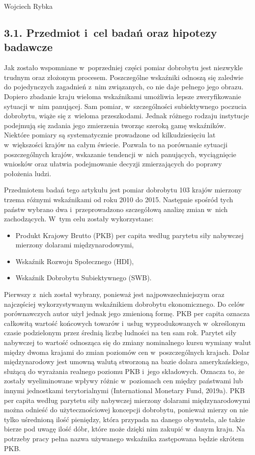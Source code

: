 \begin{artplenv}{Wojciech Rybka}
\subsection{3.1. Przedmiot i~cel badań oraz hipotezy badawcze}
Jak zostało wspomniane w~poprzedniej części pomiar dobrobytu jest niezwykle trudnym oraz złożonym procesem. Poszczególne
wskaźniki odnoszą się zaledwie do pojedynczych zagadnień z~nim związanych, co nie daje pełnego jego obrazu. Dopiero
zbadanie kraju wieloma wskaźnikami umożliwia lepsze zweryfikowanie sytuacji w~nim panującej.
Sam pomiar, w~szczególności subiektywnego poczucia dobrobytu, wiąże się z~wieloma przeszkodami.
Jednak różnego rodzaju instytucje
podejmują się zadania jego zmierzenia tworząc szeroką gamę wskaźników. Niektóre pomiary są systematycznie prowadzone od
kilkudziesięciu lat w~większości krajów na całym świecie. Pozwala to na porównanie sytuacji poszczególnych krajów,
wskazanie tendencji w~nich panujących, wyciągnięcie wniosków oraz ułatwia podejmowanie decyzji zmierzających do poprawy
położenia ludzi. 

Przedmiotem badań tego artykułu jest pomiar dobrobytu 103 krajów mierzony trzema różnymi wskaźnikami od roku 2010 do
2015. Następnie spośród tych państw wybrano dwa i~przeprowadzono szczegółową analizę zmian w~nich zachodzących.
W~tym celu zostały wykorzystane: 

\begin{itemize}
\item Produkt Krajowy Brutto (PKB) per capita według parytetu siły nabywczej mierzony dolarami międzynarodowymi,
\item Wskaźnik Rozwoju Społecznego (HDI),
\item Wskaźnik Dobrobytu Subiektywnego (SWB).
\end{itemize}

Pierwszy z~nich został wybrany, ponieważ jest najpowszechniejszym oraz najczęściej wykorzystywanym wskaźnikiem dobrobytu
ekonomicznego. Do celów porównawczych autor użył jednak jego zmienioną formę. PKB per capita oznacza całkowitą wartość
końcowych towarów i~usług wyprodukowanych w~określonym czasie podzielonym przez średnią liczbę ludności na ten sam rok.
Parytet siły nabywczej to wartość odnosząca się do zmiany nominalnego kursu wymiany walut między dwoma krajami do zmian
poziomów cen w~poszczególnych krajach. Dolar międzynarodowy jest umowną walutą stworzoną na bazie dolara
amerykańskiego, służącą do wyrażania realnego poziomu PKB i~jego składowych. Oznacza to, że zostały wyeliminowane
wpływy różnic w~poziomach cen między państwami lub innymi jednostkami terytorialnymi
\label{ref:RNDTcgwELsbvC}(International Monetary Fund, 2019a). PKB per capita według parytetu siły nabywczej mierzony
dolarami międzynarodowymi można odnieść do użytecznościowej koncepcji dobrobytu, ponieważ mierzy on nie tylko
uśrednioną ilość pieniędzy, która przypada na danego obywatela, ale także bierze pod uwagę ilość dóbr, które może
dzięki nim zakupić w~danym kraju. Na potrzeby pracy pełna nazwa używanego wskaźnika zastępowana będzie skrótem PKB.


\end{artplenv}
